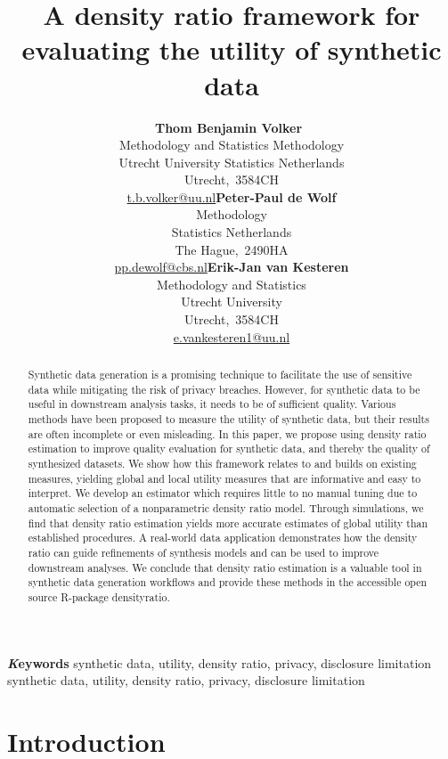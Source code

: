 \documentclass[
]{article}
\title{A density ratio framework for evaluating the utility of synthetic
data}
\author{\textbf{Thom Benjamin
Volker}~\orcidlink{0000-0002-2408-7820}\\Methodology and Statistics
\textbar{} Methodology\\Utrecht University \textbar{} Statistics
Netherlands\\Utrecht,\ 3584CH\\\href{mailto:t.b.volker@uu.nl}{t.b.volker@uu.nl}\asep\textbf{Peter-Paul
de Wolf}\\Methodology\\Statistics Netherlands\\The
Hague,\ 2490HA\\\href{mailto:pp.dewolf@cbs.nl}{pp.dewolf@cbs.nl}\asep\textbf{Erik-Jan
van Kesteren}\\Methodology and Statistics\\Utrecht
University\\Utrecht,\ 3584CH\\\href{mailto:e.vankesteren1@uu.nl}{e.vankesteren1@uu.nl}}
\date{}
\begin{document}
\maketitle
\begin{abstract}
Synthetic data generation is a promising technique to facilitate the use
of sensitive data while mitigating the risk of privacy breaches.
However, for synthetic data to be useful in downstream analysis tasks,
it needs to be of sufficient quality. Various methods have been proposed
to measure the utility of synthetic data, but their results are often
incomplete or even misleading. In this paper, we propose using density
ratio estimation to improve quality evaluation for synthetic data, and
thereby the quality of synthesized datasets. We show how this framework
relates to and builds on existing measures, yielding global and local
utility measures that are informative and easy to interpret. We develop
an estimator which requires little to no manual tuning due to automatic
selection of a nonparametric density ratio model. Through simulations,
we find that density ratio estimation yields more accurate estimates of
global utility than established procedures. A real-world data
application demonstrates how the density ratio can guide refinements of
synthesis models and can be used to improve downstream analyses. We
conclude that density ratio estimation is a valuable tool in synthetic
data generation workflows and provide these methods in the accessible
open source R-package densityratio.
\end{abstract}
{\bfseries \emph Keywords}
\def\sep{\textbullet\ }
synthetic data, utility, density ratio, privacy, disclosure
limitation \sep 
synthetic data, utility, density ratio, privacy, disclosure limitation



\section{Introduction}\label{introduction}

\linespread{1}

\linespread{2}
\end{document}
